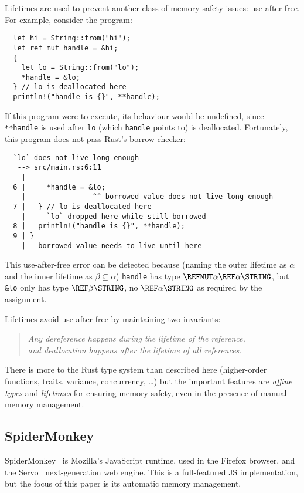 Lifetimes are used to prevent another class of memory safety issues: use-after-free.
For example, consider the program:
\begin{verbatim}
  let hi = String::from("hi");
  let ref mut handle = &hi;
  {
    let lo = String::from("lo");
    *handle = &lo;
  } // lo is deallocated here
  println!("handle is {}", **handle);
\end{verbatim}
If this program were to execute, its behaviour would be undefined,
since \verb|**handle| is used after \verb|lo|
(which \verb|handle| points to) is deallocated. Fortunately, this program
does not pass Rust's borrow-checker:
\begin{verbatim}
  `lo` does not live long enough
   --> src/main.rs:6:11
    |
  6 |     *handle = &lo;
    |                ^^ borrowed value does not live long enough
  7 |   } // lo is deallocated here
    |   - `lo` dropped here while still borrowed
  8 |   println!("handle is {}", **handle);
  9 | }
    | - borrowed value needs to live until here
\end{verbatim}
This use-after-free error can be detected because (naming the outer lifetime as
$\alpha$ and the inner lifetime as $\beta\subseteq\alpha$) \verb|handle| has type
$\REFMUT\alpha\REF\alpha\STRING$, but \verb|&lo| only has type $\REF\beta\STRING$, no
$\REF\alpha\STRING$ as required by the assignment.

Lifetimes avoid use-after-free by maintaining two invariants:
\begin{quote}\em
  Any dereference happens during the lifetime of the reference, \\
  and deallocation happens after the lifetime of all references.
\end{quote}
There is more to the Rust type system than described here
(higher-order functions, traits, variance, concurrency, \dots) but the important features
are \emph{affine types} and \emph{lifetimes} for ensuring memory safety,
even in the presence of manual memory management.

\subsection{SpiderMonkey}

SpiderMonkey~\cite{spidermonkey} is Mozilla's JavaScript runtime, used in the Firefox browser,
and the Servo~\cite{servo} next-generation web engine. This is a full-featured
JS implementation, but the focus of this paper is its automatic memory management.

